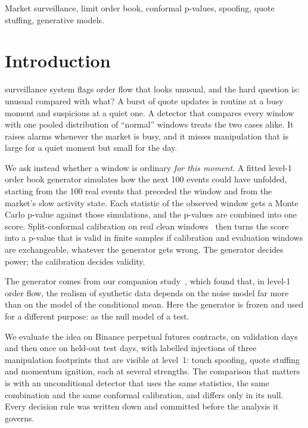 \documentclass[journal]{IEEEtran}
\begin{document}
\begin{IEEEkeywords}
Market surveillance, limit order book, conformal p-values, spoofing, quote stuffing, generative models.
\end{IEEEkeywords}

\section{Introduction}

 surveillance system flags order flow that looks unusual, and the hard question is: unusual
compared with what? A burst of quote updates is routine at a busy moment and suspicious at a quiet one. A
detector that compares every window with one pooled distribution of
``normal'' windows treats the two cases alike. It raises alarms whenever the market is busy, and it misses
manipulation that is large for a quiet moment but small for the day.

We ask instead whether a window is ordinary \emph{for this moment}. A fitted level-1 order book generator
simulates how the next 100 events could have unfolded, starting from the 100 real events that preceded the
window and from the market's slow activity state. Each statistic of the observed window gets a Monte Carlo
p-value against those simulations, and the p-values are combined into one score. Split-conformal calibration on
real clean windows~\cite{vovk2005algorithmic,bates2023testing} then turns the score into a p-value that is valid
in finite samples if calibration and evaluation windows are exchangeable, whatever the generator gets wrong. The
generator decides power; the calibration decides validity.

The generator comes from our companion study~\cite{khatib2026noise}, which found that, in level-1 order flow, the
realism of synthetic data depends on the noise model far more than on the model of the conditional mean. Here
the generator is frozen and used for a different purpose: as the null model of a test.

We evaluate the idea on \nSymbols{} Binance perpetual futures contracts, on validation days and then once on
held-out test days, with
labelled injections of three manipulation footprints that are visible at level~1: touch spoofing, quote stuffing
and momentum ignition, each at several strengths. The comparison that matters is with an unconditional
detector that uses the same statistics, the same combination and the same conformal calibration, and differs
only in its null. Every decision rule was written down and committed before the analysis it governs.
\end{document}
